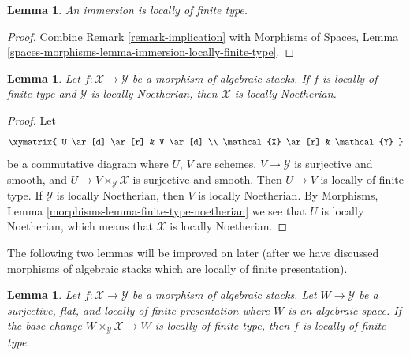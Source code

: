 \documentclass{stacks-project}
\theoremstyle{plain}
\newtheorem{lemma}[subsection]{Lemma}
\theoremstyle{definition}
\theoremstyle{remark}
\numberwithin{equation}{subsection}
\begin{document}
\begin{lemma}
\label{lemma-immersion-locally-finite-type}
An immersion is locally of finite type.
\end{lemma}

\begin{proof}
Combine Remark \ref{remark-implication} with
Morphisms of Spaces,
Lemma \ref{spaces-morphisms-lemma-immersion-locally-finite-type}.
\end{proof}

\begin{lemma}
\label{lemma-locally-finite-type-locally-noetherian}
Let $f : \mathcal{X} \to \mathcal{Y}$ be a morphism of algebraic stacks.
If $f$ is locally of finite type and $\mathcal{Y}$ is locally Noetherian,
then $\mathcal{X}$ is locally Noetherian.
\end{lemma}

\begin{proof}
Let
$$
\xymatrix{
U \ar[d] \ar[r] & V \ar[d] \\
\mathcal{X} \ar[r] & \mathcal{Y}
}
$$
be a commutative diagram where $U$, $V$ are schemes,
$V \to \mathcal{Y}$ is surjective and smooth, and
$U \to V \times_\mathcal{Y} \mathcal{X}$ is surjective and smooth.
Then $U \to V$ is locally of finite type. If $\mathcal{Y}$ is
locally Noetherian, then $V$ is locally Noetherian. By
Morphisms, Lemma \ref{morphisms-lemma-finite-type-noetherian}
we see that $U$ is locally Noetherian, which means that $\mathcal{X}$
is locally Noetherian.
\end{proof}

\noindent
The following two lemmas will be improved on later (after we have discussed
morphisms of algebraic stacks which are locally of finite presentation).

\begin{lemma}
\label{lemma-check-finite-type-covering}
Let $f : \mathcal{X} \to \mathcal{Y}$ be a morphism of algebraic stacks.
Let $W \to \mathcal{Y}$ be a surjective, flat, and locally of finite
presentation where $W$ is an algebraic space. If the base change
$W \times_\mathcal{Y} \mathcal{X} \to W$ is
locally of finite type, then $f$ is locally of finite type.
\end{lemma}
\end{document}
